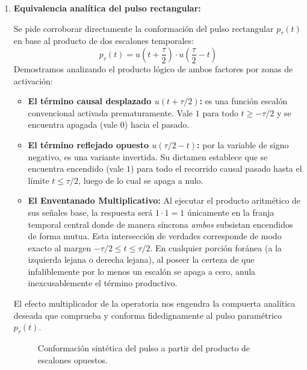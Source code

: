 \documentclass[10pt,a4paper]{article}
\begin{document}
\begin{enumerate}[label=\textbf{\alph*)}]
			\begin{figure}[H]
				\centering
				
				\caption{Gráfica de exponencial amortiguada causal $x_3(t)$.}
			\end{figure}
	
			\item \textbf{Equivalencia analítica del pulso rectangular:}
			
			Se pide corroborar directamente la conformación del pulso rectangular $p_\tau(t)$ en base al producto de dos escalones temporales:
			\[ p_\tau(t) = u\left(t + \frac{\tau}{2}\right) \cdot u\left(\frac{\tau}{2} - t\right) \]
			Demostramos analizando el producto lógico de ambos factores por zonas de activación:
			\begin{itemize}
			    \item \textbf{El término causal desplazado $u(t + \tau/2)$:} es una función escalón convencional activada prematuramente. Vale $1$ para todo $t \ge -\tau/2$ y se encuentra apagada (vale $0$) hacia el pasado.
			    \item \textbf{El término reflejado opuesto $u(\tau/2 - t)$:} por la variable de signo negativo, es una variante invertida. Su dictamen establece que se encuentra encendido (vale $1$) para todo el recorrido causal pasado hasta el límite $t \le \tau/2$, luego de lo cual se apaga a nulo.
			    \item \textbf{El Enventanado Multiplicativo:} Al ejecutar el producto aritmético de sus señales base, la respuesta será $1 \cdot 1 = 1$ únicamente en la franja temporal central donde de manera síncrona \textit{ambos} subsistan encendidos de forma mutua. Esta intersección de verdades corresponde de modo exacto al margen $-\tau/2 \le t \le \tau/2$. En cualquier porción foránea (a la izquierda lejana o derecha lejana), al poseer la certeza de que infaliblemente por lo menos un escalón se apaga a cero, anula inexcusablemente el término productivo.
			\end{itemize}
			El efecto multiplicador de la operatoria nos engendra la compuerta analítica deseada que comprueba y conforma fidedignamente al pulso paramétrico $p_\tau(t)$.
	
			\begin{figure}[H]
				\centering
				
				\caption{Conformación sintética del pulso a partir del producto de escalones opuestos.}
			\end{figure}
	\end{enumerate}
\end{document}
